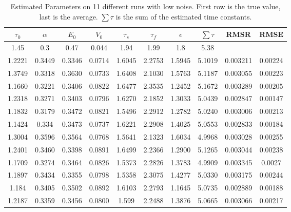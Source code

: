 \begin{table}[t]
\centering
\begin{tabular}{|c | c | c | c | c | c | c | c | c | c |}
\hline
$\tau_0$ & $\alpha$ & $E_0$    & $V_0$    & $\tau_s$ & $\tau_f$ & $\epsilon$  & $ \sum \tau $ & \acs{RMSR} & \acs{RMSE} \\
\hline
\rowcolor[gray]{.8}
1.45 & 0.3 & 0.47 & 0.044 & 1.94 & 1.99 & 1.8  & 5.38 &  & \\
\hline
\hline
1.2221 & 0.3449 & 0.3346 & 0.0714 & 1.6045 & 2.2753 & 1.5945 & 5.1019 &  0.003211  & 0.00224\\
1.3749 & 0.3318 & 0.3630 & 0.0733 & 1.6408 & 2.1030 & 1.5763 & 5.1187 &  0.003055  & 0.00223\\
1.1660 & 0.3221 & 0.3406 & 0.0822 & 1.6477 & 2.3535 & 1.2452 & 5.1672 &  0.003289  & 0.00205\\
1.2318 & 0.3271 & 0.3403 & 0.0796 & 1.6270 & 2.1852 & 1.3033 & 5.0439 &  0.002847  & 0.00147\\
1.1832 & 0.3179 & 0.3472 & 0.0821 & 1.5496 & 2.2912 & 1.2782 & 5.0240 &  0.003006  & 0.00213\\
1.1424 & 0.334  & 0.3473 & 0.0737 & 1.6221 & 2.2908 & 1.4025 & 5.0553 &  0.002833  & 0.00184\\
1.3004 & 0.3596 & 0.3564 & 0.0768 & 1.5641 & 2.1323 & 1.6034 & 4.9968 &  0.003028  & 0.00255\\
1.2401 & 0.3460 & 0.3398 & 0.0891 & 1.6499 & 2.2366 & 1.2900 & 5.1265 &  0.003044  & 0.00238\\
1.1709 & 0.3274 & 0.3464 & 0.0826 & 1.5373 & 2.2826 & 1.3783 & 4.9909 &  0.003345  & 0.0027 \\
1.1897 & 0.3434 & 0.3355 & 0.0798 & 1.5358 & 2.3075 & 1.4277 & 5.0330 &  0.003175  & 0.00244\\
1.184 &  0.3405 & 0.3502 & 0.0892 & 1.6103 & 2.2793 & 1.1645 & 5.0735 &  0.002889  & 0.00188\\
\hline                                                                               
1.2187 & 0.3359 & 0.3456 & 0.0800 & 1.599 & 2.2488 & 1.3876 & 5.0665 & 0.003066     & 0.00217\\
\hline
\end{tabular}
\caption{Estimated Parameters on 11 different runs with low noise. First row is the true value, 
last is the average. $\sum \tau$ is the sum of the estimated time constants.}
\label{tab:LowNoiseResults}
\end{table}

